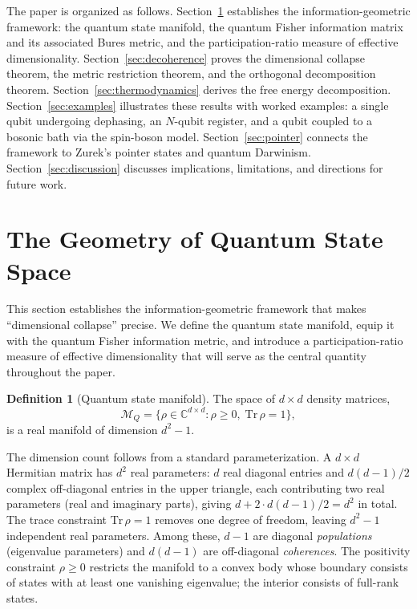 \documentclass[12pt,a4paper]{article}
\theoremstyle{definition}
\newtheorem{definition}[theorem]{Definition}
\theoremstyle{remark}
\begin{document}
The paper is organized as follows. Section~\ref{sec:geometry} establishes the information-geometric framework: the quantum state manifold, the quantum Fisher information matrix and its associated Bures metric, and the participation-ratio measure of effective dimensionality. Section~\ref{sec:decoherence} proves the dimensional collapse theorem, the metric restriction theorem, and the orthogonal decomposition theorem. Section~\ref{sec:thermodynamics} derives the free energy decomposition. Section~\ref{sec:examples} illustrates these results with worked examples: a single qubit undergoing dephasing, an $N$-qubit register, and a qubit coupled to a bosonic bath via the spin-boson model. Section~\ref{sec:pointer} connects the framework to Zurek's pointer states and quantum Darwinism. Section~\ref{sec:discussion} discusses implications, limitations, and directions for future work.

\section{The Geometry of Quantum State Space}
\label{sec:geometry}

This section establishes the information-geometric framework that makes ``dimensional collapse'' precise. We define the quantum state manifold, equip it with the quantum Fisher information metric, and introduce a participation-ratio measure of effective dimensionality that will serve as the central quantity throughout the paper.

\begin{definition}[Quantum state manifold]
\label{def:state-manifold}
The space of $d \times d$ density matrices,
\begin{equation}
\label{eq:state-manifold}
\mathcal{M}_Q = \bigl\{\rho \in \mathbb{C}^{d \times d} : \rho \geq 0,\; \mathrm{Tr}\,\rho = 1\bigr\},
\end{equation}
is a real manifold of dimension $d^2 - 1$.
\end{definition}

The dimension count follows from a standard parameterization. A $d \times d$ Hermitian matrix has $d^2$ real parameters: $d$ real diagonal entries and $d(d-1)/2$ complex off-diagonal entries in the upper triangle, each contributing two real parameters (real and imaginary parts), giving $d + 2 \cdot d(d-1)/2 = d^2$ in total. The trace constraint $\mathrm{Tr}\,\rho = 1$ removes one degree of freedom, leaving $d^2 - 1$ independent real parameters. Among these, $d - 1$ are diagonal \emph{populations} (eigenvalue parameters) and $d(d-1)$ are off-diagonal \emph{coherences}. The positivity constraint $\rho \geq 0$ restricts the manifold to a convex body whose boundary consists of states with at least one vanishing eigenvalue; the interior consists of full-rank states.
\end{document}
